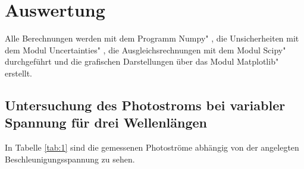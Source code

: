 \section{Auswertung}
\label{sec:Auswertung}
Alle Berechnungen werden mit dem Programm \glqq Numpy" \cite{numpy}, die Unsicherheiten mit dem Modul \glqq Uncertainties" \cite{uncertainties}, die Ausgleichsrechnungen mit dem Modul \glqq Scipy" \cite{scipy} durchgeführt und die grafischen Darstellungen über das Modul \glqq Matplotlib" \cite{matplotlib} erstellt.
\subsection{Untersuchung des Photostroms bei variabler Spannung für drei Wellenlängen}

In Tabelle \ref{tab:1} sind die gemessenen Photoströme abhängig von der angelegten Beschleunigungsspannung zu sehen. 
